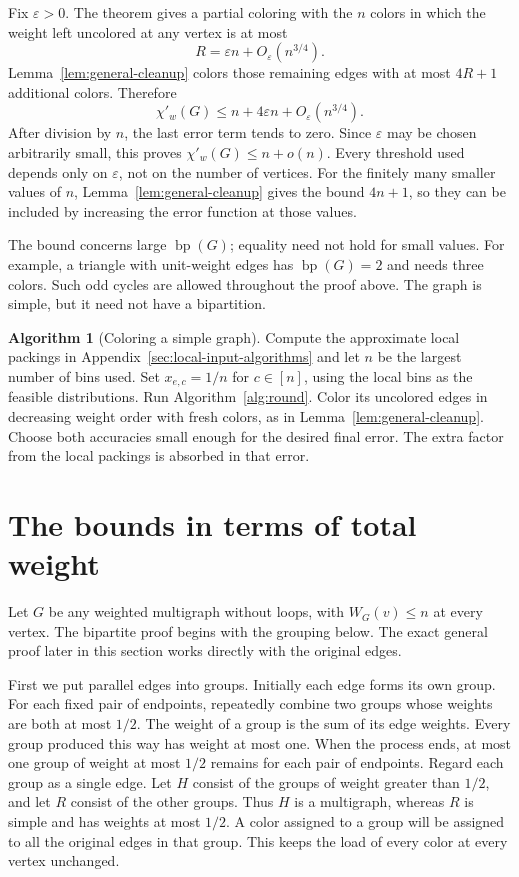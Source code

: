 \documentclass[11pt]{article}
\theoremstyle{definition}\newtheorem{algorithm}{Algorithm}[section]
\numberwithin{equation}{section}
\theoremstyle{remark}\newtheorem*{remark}{Remark}
\newcommand{\bp}{\operatorname{bp}}
\newcommand{\eps}{\varepsilon}
\begin{document}
Fix $\eps>0$. The theorem gives a partial coloring with the $n$ colors
in which the weight left uncolored at any vertex is at most
\[
 R=\eps n+O_\eps(n^{3/4}).
\]
Lemma~\ref{lem:general-cleanup} colors those remaining edges with
at most $4R+1$ additional colors. Therefore
\[
 \chi'_w(G)\le n+4\eps n+O_\eps(n^{3/4}).
\]
After division by $n$, the last error term tends to zero. Since
$\eps$ may be chosen arbitrarily small, this proves
$\chi'_w(G)\le n+o(n)$. Every threshold used depends only on $\eps$,
not on the number of vertices. For the finitely many smaller values
of $n$, Lemma~\ref{lem:general-cleanup} gives the bound $4n+1$, so they can be
included by increasing the error function at those values.


The bound concerns large $\bp(G)$; equality need not hold for small
values. For example, a triangle with unit-weight edges has $\bp(G)=2$
and needs three colors. Such odd cycles are allowed throughout the
proof above. The graph is simple, but it need not have a bipartition.


\begin{algorithm}[Coloring a simple graph]\label{alg:simple}
Compute the approximate local packings in Appendix~\ref{sec:local-input-algorithms}
and let $n$ be the largest
number of bins used. Set $x_{e,c}=1/n$ for $c\in[n]$, using the local
bins as the feasible distributions. Run Algorithm~\ref{alg:round}.
Color its uncolored edges in decreasing weight order with fresh colors,
as in Lemma~\ref{lem:general-cleanup}. Choose both accuracies small
enough for the desired final error. The extra factor from the local
packings is absorbed in that error.
\end{algorithm}

\section{The bounds in terms of total weight}
\label{sec:total-weight}\label{sec:bip-multi}\label{sec:general-multi}
Let $G$ be any weighted multigraph without loops, with $W_G(v)\le n$
at every vertex.  The bipartite proof begins with the grouping below.
The exact general proof later in this section works directly with the
original edges.

First we put parallel edges into groups. Initially each edge forms its
own group. For each fixed pair of endpoints, repeatedly combine two groups
whose weights are both at most $1/2$. The weight of a group is the sum of
its edge weights. Every group produced this way has weight at most one.
When the process ends, at most one group of weight at most $1/2$ remains
for each pair of endpoints. Regard each group as a single edge. Let $H$
consist of the groups of weight greater than $1/2$, and let $R$ consist of
the other groups. Thus $H$ is a multigraph, whereas $R$ is simple and has
weights at most $1/2$. A color assigned to a group will be assigned to
all the original edges in that group. This keeps the load of every color
at every vertex unchanged.
\end{document}
